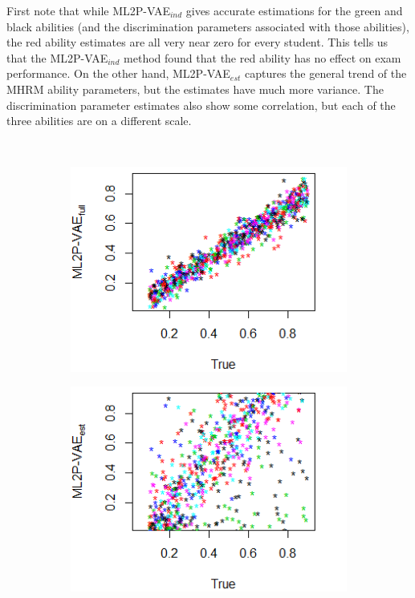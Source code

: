 First note that while ML2P-VAE$_{ind}$ gives accurate estimations for the green and black abilities (and the discrimination parameters associated with those abilities), the red ability estimates are all very near zero for every student. This tells us that the ML2P-VAE$_{ind}$ method found that the red ability has no effect on exam performance. On the other hand, ML2P-VAE$_{est}$ captures the general trend of the MHRM ability  parameters, but the estimates have much more variance. The discrimination parameter estimates also show some correlation, but each of the three abilities are on a different scale.
\begin{figure}[h]
\centering
{}\\
    \begin{subfigure}{.32\textwidth}
      \centering
      \includegraphics[width=.9\linewidth]{img/ml_journal_results/20skills/vae_full_disc_20skills.png}
    \end{subfigure}
    \begin{subfigure}{.32\textwidth}
      \centering
      \includegraphics[width=.9\linewidth]{img/ml_journal_results/20skills/vae_est_disc_20skills.png}

\end{subfigure}
\end{figure}
